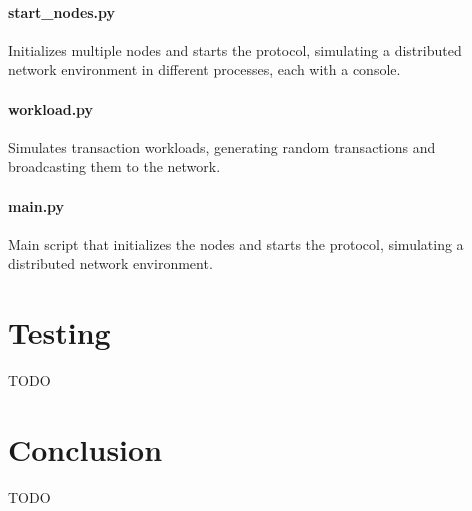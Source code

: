 \paragraph{start\_nodes.py}
Initializes multiple nodes and starts the protocol, simulating a distributed network environment in different processes, each with a console.

\paragraph{workload.py}
Simulates transaction workloads, generating random transactions and broadcasting them to the network.

\paragraph{main.py}
Main script that initializes the nodes and starts the protocol, simulating a distributed network environment.

\clearpage

\section{Testing}

TODO

\section{Conclusion}

TODO